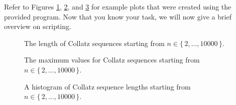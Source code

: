 Refer to Figures \ref{figure:collatz-length}, \ref{figure:collatz-maxval}, and
\ref{figure:collatz-hist} for example plots that were created using the provided
program. Now that you know your task, we will now give a brief overview on
\Bash{} scripting.

\begin{figure}[htb]
  \centering
  
  \caption{\label{figure:collatz-length}
    The length of Collatz sequences starting from $n \in \{\,2,\dots,10000\,\}$.
  }
\end{figure}

\begin{figure}[bth]
  \centering
  
  \caption{\label{figure:collatz-maxval}
    The maximum values for Collatz sequences starting from $n \in
    \{\,2,\dots,10000\,\}$.
  }
\end{figure}

\begin{figure}[bth]
  \centering
  
  \caption{\label{figure:collatz-hist}
    A histogram of Collatz sequence lengths starting from $n \in
    \{\,2,\dots,10000\,\}$.
  }
\end{figure}
